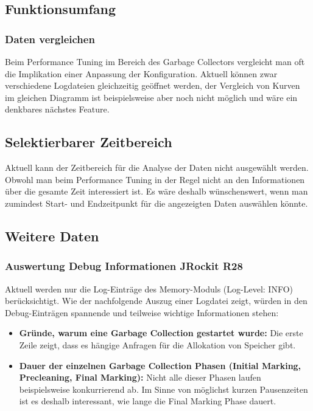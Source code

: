 \subsection{Funktionsumfang}
\subsubsection{Daten vergleichen}
Beim Performance Tuning im Bereich des Garbage Collectors vergleicht man oft die Implikation einer Anpassung der Konfiguration. Aktuell können zwar verschiedene Logdateien gleichzeitig geöffnet werden, der Vergleich von Kurven im gleichen Diagramm ist beispielsweise aber noch nicht möglich und wäre ein denkbares nächstes Feature.

\subsection{Selektierbarer Zeitbereich}
Aktuell kann der Zeitbereich für die Analyse der Daten nicht ausgewählt werden. Obwohl man beim Performance Tuning in der Regel nicht an den Informationen über die gesamte Zeit interessiert ist. Es wäre deshalb wünschenswert, wenn man zumindest Start- und Endzeitpunkt für die angezeigten Daten auswählen könnte.

\subsection{Weitere Daten}
\subsubsection{Auswertung Debug Informationen JRockit R28}\label{analyseumfang_jr28}
Aktuell werden nur die Log-Einträge des Memory-Moduls (Log-Level: INFO) berücksichtigt. Wie der nachfolgende Auszug einer Logdatei zeigt, würden in den Debug-Einträgen spannende und teilweise wichtige Informationen stehen:
\begin{itemize}
	\item \textbf{Gründe, warum eine Garbage Collection gestartet wurde:  }Die erste Zeile zeigt, dass es hängige Anfragen für die Allokation von Speicher gibt.
	\item \textbf{Dauer der einzelnen Garbage Collection Phasen (Initial Marking, Precleaning, Final Marking): } Nicht alle dieser Phasen laufen beispielsweise konkurrierend ab. Im Sinne von möglichst kurzen Pausenzeiten ist es deshalb interessant, wie lange die Final Marking Phase dauert. 
\end{itemize}

